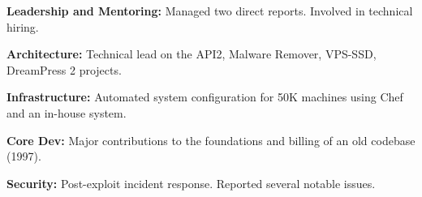 
\item \textbf{Leadership and Mentoring:}
  Managed two direct reports.
  Involved in technical hiring.

\item \textbf{Architecture:}
  Technical lead on the API2, Malware Remover, VPS-SSD, DreamPress 2 projects.

\item \textbf{Infrastructure:}
  Automated system configuration for 50K machines using Chef and an in-house system.

\item \textbf{Core Dev:} Major contributions to the foundations and billing of an old codebase (1997).

\item \textbf{Security:}
  Post-exploit incident response.
  Reported several notable issues.



